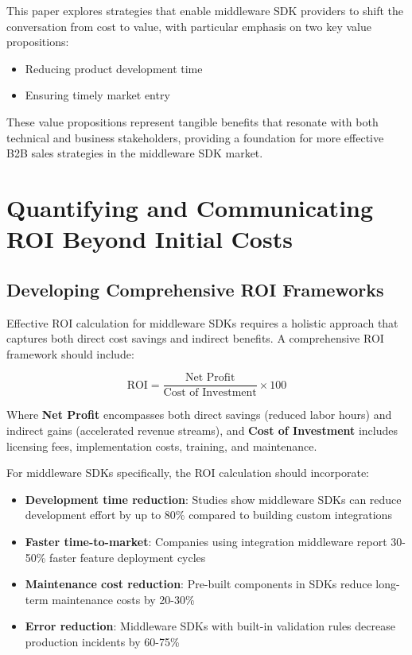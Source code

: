 \documentclass[11pt,a4paper]{article}
\begin{document}
This paper explores strategies that enable middleware SDK providers to shift the conversation from cost to value, with particular emphasis on two key value propositions:

\begin{itemize}
    \item Reducing product development time
    \item Ensuring timely market entry
\end{itemize}

These value propositions represent tangible benefits that resonate with both technical and business stakeholders, providing a foundation for more effective B2B sales strategies in the middleware SDK market.

\section{Quantifying and Communicating ROI Beyond Initial Costs}

\subsection{Developing Comprehensive ROI Frameworks}

Effective ROI calculation for middleware SDKs requires a holistic approach that captures both direct cost savings and indirect benefits. A comprehensive ROI framework should include:

\begin{equation}
\text{ROI} = \frac{\text{Net Profit}}{\text{Cost of Investment}} \times 100
\end{equation}

Where \textbf{Net Profit} encompasses both direct savings (reduced labor hours) and indirect gains (accelerated revenue streams), and \textbf{Cost of Investment} includes licensing fees, implementation costs, training, and maintenance.

For middleware SDKs specifically, the ROI calculation should incorporate:

\begin{itemize}
    \item \textbf{Development time reduction}: Studies show middleware SDKs can reduce development effort by up to 80\% compared to building custom integrations
    \item \textbf{Faster time-to-market}: Companies using integration middleware report 30-50\% faster feature deployment cycles
    \item \textbf{Maintenance cost reduction}: Pre-built components in SDKs reduce long-term maintenance costs by 20-30\%
    \item \textbf{Error reduction}: Middleware SDKs with built-in validation rules decrease production incidents by 60-75\%
\end{itemize}
\end{document}
